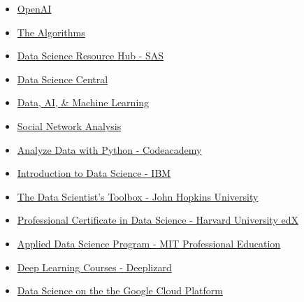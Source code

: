 \documentclass[
]{article}
\providecommand{\tightlist}{%
  \setlength{\itemsep}{0pt}\setlength{\parskip}{0pt}}
\begin{document}
\begin{itemize}
\tightlist
\item
  \href{https://openai.com/}{OpenAI}
\item
  \href{https://the-algorithms.com}{The Algorithms}
\item
  \href{https://www.sas.com/en_us/training/academy-data-science/data-science-resources.html\#data-scientist-learning-journey}{Data
  Science Resource Hub - SAS}
\item
  \href{https://www.datasciencecentral.com/category/technical-topics/data-science/}{Data
  Science Central}
\item
  \href{https://sloanreview.mit.edu/topic/data-ai-machine-learning/}{Data,
  AI, \& Machine Learning}
\item
  \href{https://www.kdnuggets.com/2015/06/top-30-social-network-analysis-visualization-tools.html}{Social
  Network Analysis}
\item
  \href{https://www.codecademy.com/learn/paths/analyze-data-with-python}{Analyze
  Data with Python - Codeacademy}
\item
  \href{https://www.edx.org/course/intro-to-data-science?index=product\&search_index=product\&webview=false\&campaign=Introduction+to+Data+Science\&source=edX\&product_category=course\&placement_url=https\%3A\%2F\%2Fwww.edx.org\%2Flearn\%2Fdata-analysis}{Introduction
  to Data Science - IBM}
\item
  \href{https://www.coursera.org/learn/data-scientists-tools}{The Data
  Scientist's Toolbox - John Hopkins University}
\item
  \href{https://www.edx.org/professional-certificate/harvardx-data-science?index=product\&search_index=product\&webview=false\&campaign=Data++Science\&source=edX\&product_category=professional-certificate\&placement_url=https\%3A\%2F\%2Fwww.edx.org\%2Flearn\%2Fdata-analysis}{Professional
  Certificate in Data Science - Harvard University edX}
\item
  \href{https://professional-education-gl.mit.edu/mit-applied-data-science-course?\&utm_source=google\&utm_medium=search\&utm_campaign=ADSB_Int_Search_Program_Broad_US-E_NewLP\&adgroup_id=152133034790\&campaign_id=20012657719\&Keyword=data\%20scientist\%20program\&placement=\&utm_content=655818703904\&utm_target=kwd-57785127948\&gclid=CjwKCAjwscGjBhAXEiwAswQqNFgWeE1nquYWCBJV8r_WHNmkgvqUGVqmjMcVyufULcz24lIdp3U37xoC6gIQAvD_BwE}{Applied
  Data Science Program - MIT Professional Education}
\item
  \href{https://deeplizard.com}{Deep Learning Courses - Deeplizard}
\item
  \href{https://www.oreilly.com/library/view/data-science-on/9781491974551/}{Data
  Science on the the Google Cloud Platform}
\end{itemize}
\end{document}
